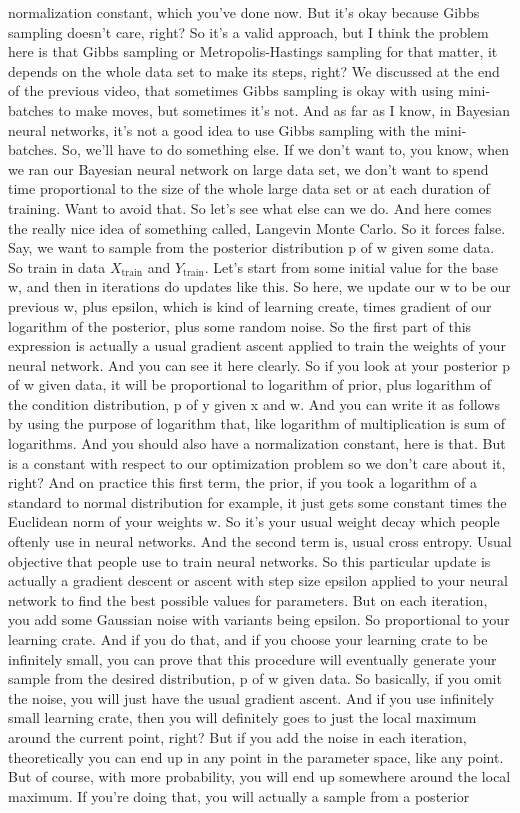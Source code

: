 \documentclass[11pt, oneside, reqno]{amsart}
\numberwithin{equation}{section}
\theoremstyle{plain}%
\theoremstyle{definition}
\theoremstyle{remark}
\begin{document}
normalization constant, which you've done now. But it's okay because Gibbs sampling doesn't care, right? So it's a valid approach, but I think the problem here is that Gibbs sampling or Metropolis-Hastings sampling for that matter, it depends on the whole data set to make its steps, right? We discussed at the end of the previous video, that sometimes Gibbs sampling is okay with using mini-batches to make moves, but sometimes it's not. And as far as I know, in Bayesian neural networks, it's not a good idea to use Gibbs sampling with the mini-batches. So, we'll have to do something else. If we don't want to, you know, when we ran our Bayesian neural network on large data set, we don't want to spend time proportional to the size of the whole large data set or at each duration of training. Want to avoid that. So let's see what else can we do. And here comes the really nice idea of something called, Langevin Monte Carlo. So it forces false. Say, we want to sample from the posterior distribution p of w given some data. So train in data $X_\text{train}$ and $Y_\text{train}$. Let's start from some initial value for the base w, and then in iterations do updates like this. So here, we update our w to be our previous w, plus epsilon, which is kind of learning create, times gradient of our logarithm of the posterior, plus some random noise. So the first part of this expression is actually a usual gradient ascent applied to train the weights of your neural network. And you can see it here clearly. So if you look at your posterior p of w given data, it will be proportional to logarithm of prior, plus logarithm of the condition distribution, p of y given x and w. And you can write it as follows by using the purpose of logarithm that, like logarithm of multiplication is sum of logarithms. And you should also have a normalization constant, here is that. But is a constant with respect to our optimization problem so we don't care about it, right? And on practice this first term, the prior, if you took a logarithm of a standard to normal distribution for example, it just gets some constant times the Euclidean norm of your weights w. So it's your usual weight decay which people oftenly use in neural networks. And the second term is, usual cross entropy. Usual objective that people use to train neural networks. So this particular update is actually a gradient descent or ascent with step size epsilon applied to your neural network to find the best possible values for parameters. But on each iteration, you add some Gaussian noise with variants being epsilon. So proportional to your learning crate. And if you do that, and if you choose your learning crate to be infinitely small, you can prove that this procedure will eventually generate your sample from the desired distribution, p of w given data. So basically, if you omit the noise, you will just have the usual gradient ascent. And if you use infinitely small learning crate, then you will definitely goes to just the local maximum around the current point, right? But if you add the noise in each iteration, theoretically you can end up in any point in the parameter space, like any point. But of course, with more probability, you will end up somewhere around the local maximum. If you're doing that, you will actually a sample from a posterior 
\end{document}
